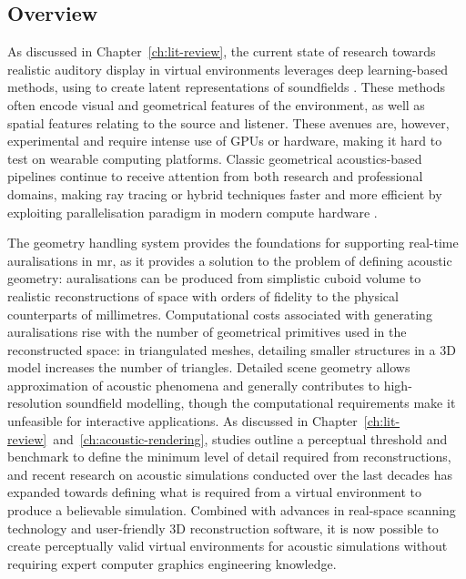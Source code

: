 \subsection{Overview}
As discussed in Chapter~\ref{ch:lit-review}, the current state of research towards realistic auditory display in virtual environments leverages deep learning-based methods, using  to create latent representations of soundfields \citep{liu2022sound, ratnarajah2022mesh2ir, chen2023everywhere}. These methods often encode visual and geometrical features of the environment, as well as spatial features relating to the source and listener. These avenues are, however, experimental and require intense use of GPUs or hardware, making it hard to test on wearable computing platforms. Classic geometrical acoustics-based pipelines continue to receive attention from both research and professional domains, making ray tracing or hybrid techniques faster and more efficient by exploiting parallelisation paradigm in modern compute hardware \citep{cowan2010gpu,diaz2021gpurir}.\par
The geometry handling system provides the foundations for supporting real-time auralisations in \acrshort{mr}, as it provides a solution to the problem of defining acoustic geometry: auralisations can be produced from simplistic cuboid volume to realistic reconstructions of space with orders of fidelity to the physical counterparts of millimetres. Computational costs associated with generating auralisations rise with the number of geometrical primitives used in the reconstructed space: in triangulated meshes, detailing smaller structures in a 3D model increases the number of triangles. Detailed scene geometry allows approximation of acoustic phenomena and generally contributes to high-resolution soundfield modelling, though the computational requirements make it unfeasible for interactive applications. As discussed in Chapter~\ref{ch:lit-review}~and~\ref{ch:acoustic-rendering}, studies outline a perceptual threshold and benchmark to define the minimum level of detail required from reconstructions, and recent research on acoustic simulations conducted over the last decades has expanded towards defining what is required from a virtual environment to produce a believable simulation. Combined with advances in real-space scanning technology and user-friendly 3D reconstruction software, it is now possible to create perceptually valid virtual environments for acoustic simulations without requiring expert computer graphics engineering knowledge.\par

